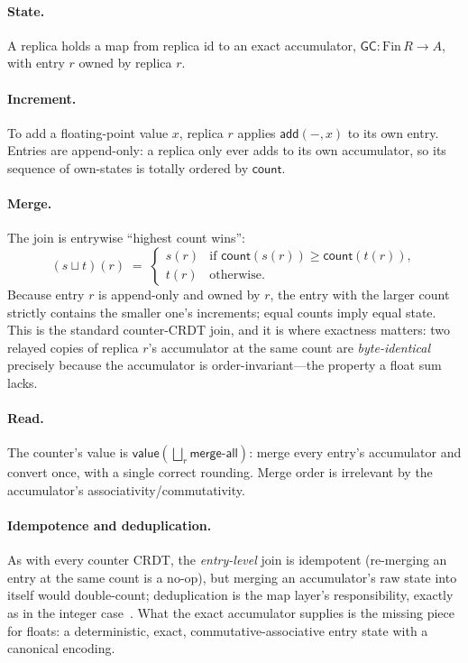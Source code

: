\documentclass[11pt]{article}
\begin{document}
\paragraph{State.} A replica holds a map from replica id to an exact accumulator,
$\mathsf{GC} : \mathrm{Fin}\,R \to A$, with entry $r$ owned by replica $r$.

\paragraph{Increment.} To add a floating-point value $x$, replica $r$ applies $\mathsf{add}(-, x)$ to
its own entry. Entries are append-only: a replica only ever adds to its own accumulator, so its
sequence of own-states is totally ordered by $\mathsf{count}$.

\paragraph{Merge.} The join is entrywise ``highest count wins'':
\[
(s \sqcup t)(r) \;=\;
\begin{cases}
s(r) & \text{if } \mathsf{count}(s(r)) \ge \mathsf{count}(t(r)),\\
t(r) & \text{otherwise.}
\end{cases}
\]
Because entry $r$ is append-only and owned by $r$, the entry with the larger count strictly contains the
smaller one's increments; equal counts imply equal state. This is the standard counter-CRDT join, and it
is where exactness matters: two relayed copies of replica $r$'s accumulator at the same count are
\emph{byte-identical} precisely because the accumulator is order-invariant---the property a float sum
lacks.

\paragraph{Read.} The counter's value is $\mathsf{value}\!\left(\bigsqcup_r \mathsf{merge\text{-}all}\right)$:
merge every entry's accumulator and convert once, with a single correct rounding. Merge order is
irrelevant by the accumulator's associativity/commutativity.

\paragraph{Idempotence and deduplication.} As with every counter CRDT, the \emph{entry-level} join is
idempotent (re-merging an entry at the same count is a no-op), but merging an accumulator's raw state
into itself would double-count; deduplication is the map layer's responsibility, exactly as in the
integer case~\cite{shapiro}. What the exact accumulator supplies is the missing piece for floats: a
deterministic, exact, commutative-associative entry state with a canonical encoding.
\end{document}
